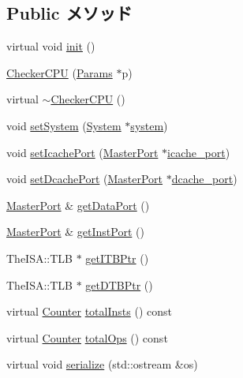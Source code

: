 \subsection*{Public メソッド}
\begin{DoxyCompactItemize}
\item 
virtual void \hyperlink{classCheckerCPU_a02fd73d861ef2e4aabb38c0c9ff82947}{init} ()
\item 
\hyperlink{classCheckerCPU_a35dbdd3a266a1df157875f0f7c5b5f66}{CheckerCPU} (\hyperlink{classCheckerCPU_a56bf98a1e02b979e88cbf64420995961}{Params} $\ast$p)
\item 
virtual \hyperlink{classCheckerCPU_ac259e064f2f0d74835ec2b38dd175ef4}{$\sim$CheckerCPU} ()
\item 
void \hyperlink{classCheckerCPU_a87165dd3c0f61d17b5decfdd925b3fcd}{setSystem} (\hyperlink{classSystem}{System} $\ast$\hyperlink{classBaseCPU_ab737471139f5a296e5b26e8a0e1b0744}{system})
\item 
void \hyperlink{classCheckerCPU_a925d02a64d6c947d4ba3bb96bef728ff}{setIcachePort} (\hyperlink{classMasterPort}{MasterPort} $\ast$\hyperlink{classBaseCPU_ada744b98d4371502b5cb7c4f036f1344}{icache\_\-port})
\item 
void \hyperlink{classCheckerCPU_a8d77cc755c7a424f4eb80130fb627012}{setDcachePort} (\hyperlink{classMasterPort}{MasterPort} $\ast$\hyperlink{classBaseCPU_a9c199cadc0aca1c84868beea5d4402e7}{dcache\_\-port})
\item 
\hyperlink{classMasterPort}{MasterPort} \& \hyperlink{classCheckerCPU_a041a57fcad534c1bed3702a0f8f3a6b1}{getDataPort} ()
\item 
\hyperlink{classMasterPort}{MasterPort} \& \hyperlink{classCheckerCPU_ab8ce6baf7cb0aaaf4ca346896a86fa03}{getInstPort} ()
\item 
TheISA::TLB $\ast$ \hyperlink{classCheckerCPU_a95b7e95d0558cd03d69613142fff9137}{getITBPtr} ()
\item 
TheISA::TLB $\ast$ \hyperlink{classCheckerCPU_a2fe6a07c44bc2a4d83b86bea605ba971}{getDTBPtr} ()
\item 
virtual \hyperlink{base_2types_8hh_ae1475755791765b8e6f6a8bb091e273e}{Counter} \hyperlink{classCheckerCPU_abdcc0de01ff3d8d22a40e0b966acb463}{totalInsts} () const 
\item 
virtual \hyperlink{base_2types_8hh_ae1475755791765b8e6f6a8bb091e273e}{Counter} \hyperlink{classCheckerCPU_adfb528b512cf037ade8dc8e22bf8a7bd}{totalOps} () const 
\item 
virtual void \hyperlink{classCheckerCPU_ad6272f80ae37e8331e3969b3f072a801}{serialize} (std::ostream \&os)

\end{DoxyCompactItemize}
